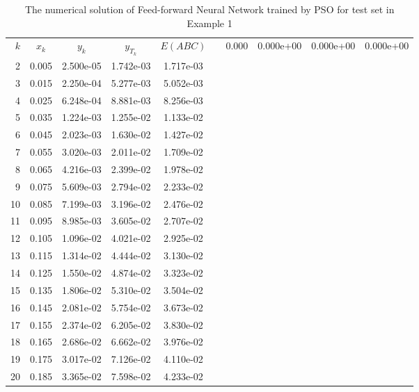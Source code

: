 \begin{table}[ht]
  \caption{The numerical solution of Feed-forward Neural Network trained by PSO for test set in Example 1}
  \centering
  \begin{tabular}{rcccccc}
    $k$ & $x_{k}$ & $y_{k}$ & $y_{T_{k}}$ & $E(ABC)$ &     \hline{} &  0.000 &       0.000e+00 &       0.000e+00  &        0.000e+00\\ 
     2 &  0.005 &       2.500e-05 &       1.742e-03  &        1.717e-03\\ 
     3 &  0.015 &       2.250e-04 &       5.277e-03  &        5.052e-03\\ 
     4 &  0.025 &       6.248e-04 &       8.881e-03  &        8.256e-03\\ 
     5 &  0.035 &       1.224e-03 &       1.255e-02  &        1.133e-02\\ 
     6 &  0.045 &       2.023e-03 &       1.630e-02  &        1.427e-02\\ 
     7 &  0.055 &       3.020e-03 &       2.011e-02  &        1.709e-02\\ 
     8 &  0.065 &       4.216e-03 &       2.399e-02  &        1.978e-02\\ 
     9 &  0.075 &       5.609e-03 &       2.794e-02  &        2.233e-02\\ 
    10 &  0.085 &       7.199e-03 &       3.196e-02  &        2.476e-02\\ 
    11 &  0.095 &       8.985e-03 &       3.605e-02  &        2.707e-02\\ 
    12 &  0.105 &       1.096e-02 &       4.021e-02  &        2.925e-02\\ 
    13 &  0.115 &       1.314e-02 &       4.444e-02  &        3.130e-02\\ 
    14 &  0.125 &       1.550e-02 &       4.874e-02  &        3.323e-02\\ 
    15 &  0.135 &       1.806e-02 &       5.310e-02  &        3.504e-02\\ 
    16 &  0.145 &       2.081e-02 &       5.754e-02  &        3.673e-02\\ 
    17 &  0.155 &       2.374e-02 &       6.205e-02  &        3.830e-02\\ 
    18 &  0.165 &       2.686e-02 &       6.662e-02  &        3.976e-02\\ 
    19 &  0.175 &       3.017e-02 &       7.126e-02  &        4.110e-02\\ 
    20 &  0.185 &       3.365e-02 &       7.598e-02  &        4.233e-02\\ 

\end{tabular}
\end{table}
